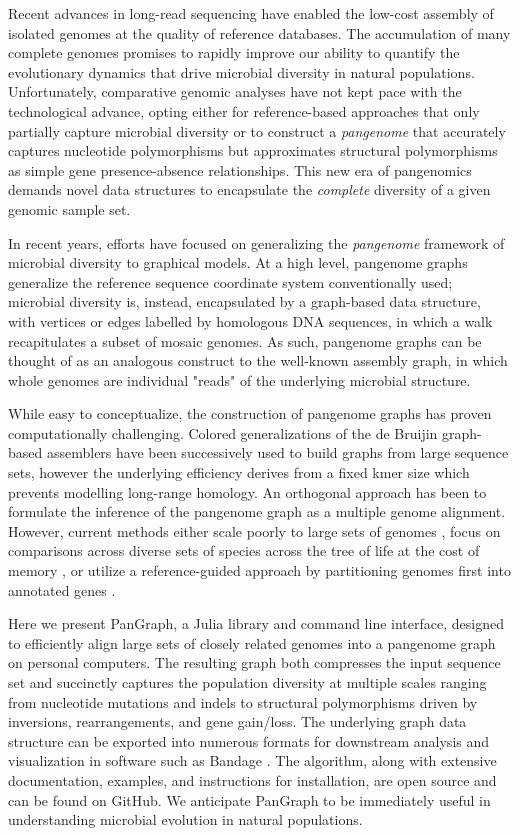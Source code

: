 \documentclass[aps,rmp,reprint,superscriptaddress,notitlepage,10pt]{revtex4-1}
\begin{document}
Recent advances in long-read sequencing have enabled the low-cost assembly of isolated genomes at the quality of reference databases.
The accumulation of many complete genomes promises to rapidly improve our ability to quantify the evolutionary dynamics that drive microbial diversity in natural populations.
Unfortunately, comparative genomic analyses have not kept pace with the technological advance, opting either for reference-based approaches that only partially capture microbial diversity or to construct a \emph{pangenome} that accurately captures nucleotide polymorphisms but approximates structural polymorphisms as simple gene presence-absence relationships.
This new era of pangenomics demands novel data structures to encapsulate the \emph{complete} diversity of a given genomic sample set.

In recent years, efforts have focused on generalizing the \emph{pangenome} framework of microbial diversity to graphical models.
At a high level, pangenome graphs generalize the reference sequence coordinate system conventionally used; microbial diversity is, instead, encapsulated by a graph-based data structure, with vertices or edges labelled by homologous DNA sequences, in which a walk recapitulates a subset of mosaic genomes.
As such, pangenome graphs can be thought of as an analogous construct to the well-known assembly graph, in which whole genomes are individual "reads" of the underlying microbial structure.

While easy to conceptualize, the construction of pangenome graphs has proven computationally challenging.
Colored generalizations of the de Bruijin graph-based assemblers have been successively used to build graphs from large sequence sets, however the underlying efficiency derives from a fixed kmer size which prevents modelling long-range homology.
An orthogonal approach has been to formulate the inference of the pangenome graph as a multiple genome alignment.
However, current methods either scale poorly to large sets of genomes \cite{darling2010progressivemauve}, focus on comparisons across diverse sets of species across the tree of life at the cost of memory \cite{armstrong2020progressive}, or utilize a reference-guided approach by partitioning genomes first into annotated genes \cite{gautreau2020ppanggolin}.

Here we present PanGraph, a Julia library and command line interface, designed to efficiently align large sets of closely related genomes into a pangenome graph on personal computers.
The resulting graph both compresses the input sequence set and succinctly captures the population diversity at multiple scales ranging from nucleotide mutations and indels to structural polymorphisms driven by inversions, rearrangements, and gene gain/loss.
The underlying graph data structure can be exported into numerous formats for downstream analysis and visualization in software such as Bandage \cite{wick2015bandage}.
The algorithm, along with extensive documentation, examples, and instructions for installation, are open source and can be found on GitHub.
We anticipate PanGraph to be immediately useful in understanding microbial evolution in natural populations.
\end{document}
